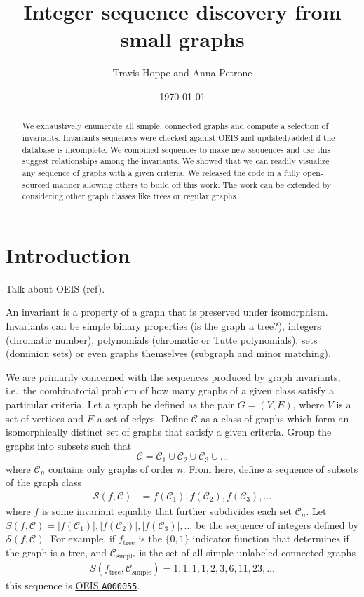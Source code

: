 \documentclass[12pt]{article}
\newcommand{\OEIS}[1]
{\href{https://oeis.org/#1}{OEIS \texttt{#1}}}
\newcommand{\SEQ}{\mathcal{S}}
\newcommand{\CLASS}{\mathcal{C}}
\newcommand{\SIMPLECLASS}{\mathcal{C}_\text{simple}}
\newcommand{\ie}[0]{i.e.\ }
\begin{document}
\title{Integer sequence discovery from small graphs}
\author{Travis Hoppe and Anna Petrone}
\date{\today}
\maketitle

\begin{abstract}
We exhaustively enumerate all simple, connected graphs and compute a selection of invariants. 
Invariants sequences were checked against OEIS and updated/added if the database is incomplete.
We combined sequences to make new sequences and use this suggest relationships among the invariants.
We showed that we can readily visualize any sequence of graphs with a given criteria.
We released the code in a fully open-sourced manner allowing others to build off this work.
The work can be extended by considering other graph classes like trees or regular graphs.
\end{abstract}

\section{Introduction}

Talk about OEIS (ref).

An invariant is a property of a graph that is preserved under isomorphism. 
Invariants can be simple binary properties (is the graph a tree?), integers (chromatic number), polynomials (chromatic or Tutte polynomials), sets (dominion sets) or even graphs themselves (subgraph and minor matching).

We are primarily concerned with the sequences produced by graph invariants, \ie the combinatorial problem of how many graphs of a given class satisfy a particular criteria.
Let a graph be defined as the pair $G = (V,E)$, where $V$ is a set of vertices and $E$ a set of edges. 
Define $\CLASS$ as a class of graphs which form an isomorphically distinct set of graphs that satisfy a given criteria.
Group the graphs into subsets such that
\begin{equation}
\CLASS = \CLASS_1 \cup \CLASS_2 \cup \CLASS_3 \cup \ldots
\end{equation}
where $\CLASS_n$ contains only graphs of order $n$.
From here, define a sequence of subsets of the graph class
%
\begin{align}
\SEQ(f, \CLASS) 
&= f(\CLASS_1), f(\CLASS_2), f(\CLASS_3), \ldots 
\end{align}
%
where $f$ is some invariant equality that further subdivides each set $\CLASS_n$. 
Let 
$S(f, \CLASS) = |f(\CLASS_1)|, |f(\CLASS_2)|, |f(\CLASS_3)|, \ldots$
be the sequence of integers defined by $\SEQ(f, \CLASS)$.
For example, if $f_\text{tree}$ is the $\{0,1\}$ indicator function that determines if the graph is a tree, and $\SIMPLECLASS$ is the set of all simple unlabeled connected graphs
%
\begin{align}
S(f_\text{tree}, \SIMPLECLASS) = 1, 1, 1, 1, 2, 3, 6, 11, 23, \ldots
\end{align}
%
this sequence is \OEIS{A000055}.
\end{document}
